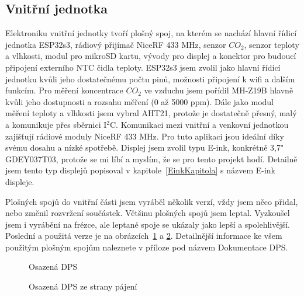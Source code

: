         \subsection{Vnitřní jednotka} \label{ElVnitrniJednotka}
            Elektroniku vnitřní jednotky tvoří plošný spoj, na kterém se nachází hlavní řídicí jednotka ESP32s3, rádiový přijímač NiceRF 433 MHz, senzor $CO_2$, senzor teploty a vlhkosti, modul pro mikroSD kartu, vývody pro displej a konektor pro budoucí připojení externího NTC čidla teploty. ESP32s3 jsem zvolil jako hlavní řídicí jednotku kvůli jeho dostatečnému počtu pinů, možnosti připojení k wifi a dalším funkcím. Pro měření koncentrace $CO_2$ ve vzduchu jsem pořídil MH-Z19B hlavně kvůli jeho dostupnosti a rozsahu měření (0 až 5000 ppm). Dále jako modul měření teploty a vlhkosti jsem vybral AHT21, protože je dostatečně přesný, malý a komunikuje přes sběrnici I$^2$C. Komunikaci mezi vnitřní a venkovní jednotkou zajišťují rádiové moduly NiceRF 433 MHz. Pro tuto aplikaci jsou ideální díky svému dosahu a nízké spotřebě. Displej jsem zvolil typu E-ink, konkrétně 3,7" GDEY037T03, protože se mi líbí a myslím, že se pro tento projekt hodí. Detailně jsem tento typ displejů popisoval v kapitole~\ref{EinkKapitola} s názvem E-ink displeje.

            Plošných spojů do vnitřní části jsem vyráběl několik verzí, vždy jsem něco přidal, nebo změnil rozvržení součástek. Většinu plošných spojů jsem leptal. Vyzkoušel jsem i vyrábění na frézce, ale leptané spoje se ukázaly jako lepší a spolehlivější. Poslední a použitá verze je na obrázcích~\ref{DPSosazena} a \ref{DPSpajeni}. Detailnější informace ke všem použitým plošným spojům naleznete v příloze pod názvem Dokumentace DPS.

            \begin{figure}[htb]
            \caption{Osazená DPS}
            \label{DPSosazena}
            \end{figure}

            \begin{figure}[htb]
            \caption{Osazená DPS ze strany pájení}
            \label{DPSpajeni}
            \end{figure}

        \clearpage

